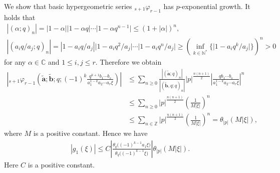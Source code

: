\documentclass[pdftex]{sigma}
\numberwithin{equation}{section}
\begin{document}
We show that basic hypergeometric series ${}_{s+1}\varphi_{r-1}$ has $p$-exponential growth. It holds that
\begin{gather*}
|(\alpha;q)_n| =|1-\alpha||1-\alpha q|\cdots\big|1-\alpha q^{n-1}\big|\le(1+|\alpha|)^n,\\
|(a_iq/a_j;q)_n| =|1-a_iq/a_j|\big|1-a_iq^2/a_j\big|\cdots\big|1-a_iq^n/a_j\big|\ge \left(\inf_{k\in\mathbb{N}^*}\big\{\big|1-a_iq^k/a_j\big|\big\}\right)^n>0
\end{gather*}
for any $\alpha\in\mathbb{C}$ and $1\le i,j\le r$. Therefore we obtain
\begin{align*}
\left|{}_{s+1}\varphi_{r-1}\left(\tilde{\bm{a}};\tilde{\bm{b}};q;(-1)^k\frac{q^{k+1}b_1\cdots b_s}{a_1^{1-k}a_2\cdots a_r\xi}\right)\right|&\le\sum_{n\ge0}\frac{|(\tilde{\bm{a}};q)_n|}{|(\tilde{\bm{b}},q;q)_n|}|p|^{\frac{n(n+1)}{2}}\left|\frac{qb_1\cdots b_s}{a_1^{1-k}a_2\cdots a_r\xi}\right|^n\\
&\le\sum_{n\ge0}|p|^{\frac{n(n+1)}{2}}\left(\frac{1}{M|\xi|}\right)^n\\
&\le\sum_{n\in\mathbb{Z}}|p|^{\frac{n(n+1)}{2}}\left(\frac{1}{M|\xi|}\right)^n=\theta_{|p|}(M|\xi|),
\end{align*}
where $M$ is a positive constant. Hence we have
\begin{gather}\label{g1_estimate_1}
|g_1(\xi)|\le C\left|\frac{\theta_q\big((-1)^{k-1}a_1\xi\big)}{\theta_q\big((-1)^{k-1}\xi\big)}\right|\theta_{|p|}(M|\xi|).
\end{gather}
Here $C$ is a positive constant.
\end{document}
